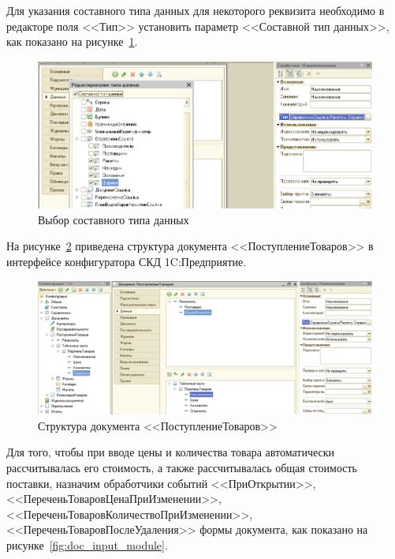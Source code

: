 Для указания составного типа данных для некоторого реквизита необходимо в
редакторе поля <<Тип>> установить параметр <<Составной тип данных>>,
как показано на рисунке~\ref{fig:complex_type}.

\begin{figure}[h!]
  \centering
  \includegraphics[width=150mm]{pic/complex_type}
  \caption{Выбор составного типа данных}
  \label{fig:complex_type}
\end{figure}

На рисунке~\ref{fig:doc_input} приведена
структура документа <<ПоступлениеТоваров>> в интерфейсе конфигуратора
СКД 1C:Предприятие.

\begin{figure}[h!]
  \centering
  \includegraphics[width=150mm]{pic/doc_input}
  \caption{Структура документа <<ПоступлениеТоваров>>}
  \label{fig:doc_input}
\end{figure}

Для того, чтобы при вводе цены и количества товара автоматически
рассчитывалась его стоимость, а также рассчитывалась общая стоимость
поставки, назначим обработчики событий
<<ПриОткрытии>>,
<<ПереченьТоваровЦенаПриИзменении>>,
<<ПереченьТоваровКоличествоПриИзменении>>,
<<ПереченьТоваровПослеУдаления>>
формы документа, как показано на рисунке~\ref{fig:doc_input_module}.

